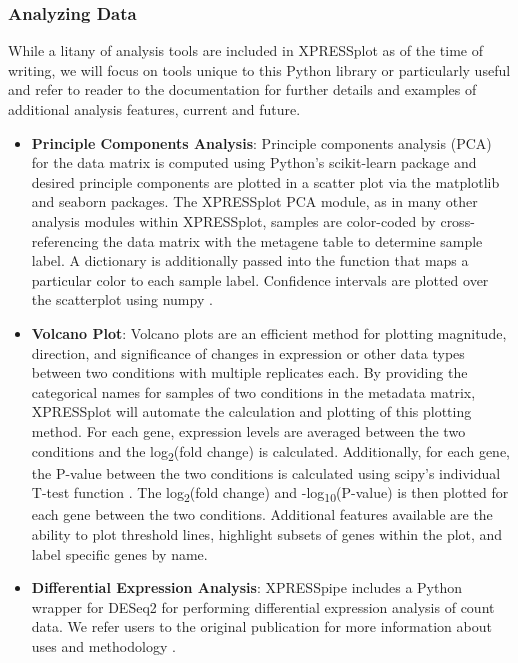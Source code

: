 \documentclass[11pt, a4paper, oneside]{article}
\begin{document}
\subsubsection{Analyzing Data}

While a litany of analysis tools are included in XPRESSplot as of the time of writing, we will focus on tools unique to this Python library or particularly useful and refer to reader to the documentation for further details and examples of additional analysis features, current and future.

\begin{itemize}
  \item \textbf{Principle Components Analysis}: Principle components analysis (PCA) for the data matrix is computed using Python's scikit-learn package \cite{scikit_learn} and desired principle components are plotted in a scatter plot via the matplotlib \cite{matplotlib} and seaborn \cite{seaborn} packages. The XPRESSplot PCA module, as in many other analysis modules within XPRESSplot, samples are color-coded by cross-referencing the data matrix with the metagene table to determine sample label. A dictionary is additionally passed into the function that maps a particular color to each sample label. Confidence intervals are plotted over the scatterplot using numpy \cite{numpy1, numpy2}.

  \item \textbf{Volcano Plot}: Volcano plots are an efficient method for plotting magnitude, direction, and significance of changes in expression or other data types between two conditions with multiple replicates each. By providing the categorical names for samples of two conditions in the metadata matrix, XPRESSplot will automate the calculation and plotting of this plotting method. For each gene, expression levels are averaged between the two conditions and the log\textsubscript{2}(fold change) is calculated. Additionally, for each gene, the P-value between the two conditions is calculated using scipy's individual T-test function \cite{scipy}. The log\textsubscript{2}(fold change) and -log\textsubscript{10}(P-value) is then plotted for each gene between the two conditions. Additional features available are the ability to plot threshold lines, highlight subsets of genes within the plot, and label specific genes by name.

    \item \textbf{Differential Expression Analysis}: XPRESSpipe includes a Python wrapper for DESeq2 for performing differential expression analysis of count data. We refer users to the original publication for more information about uses and methodology \cite{deseq2}.

\end{itemize}
\end{document}
